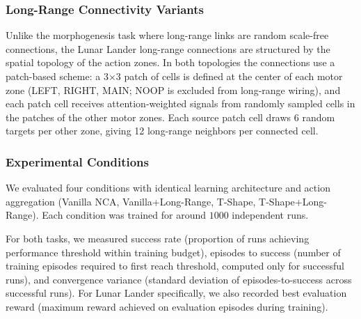 \documentclass[letterpaper]{article}
\begin{document}
\subsubsection{Long-Range Connectivity Variants}

Unlike the morphogenesis task where long-range links are random scale-free connections, the Lunar Lander long-range connections are structured by the spatial topology of the action zones. In both topologies the connections use a patch-based scheme: a 3$\times$3 patch of cells is defined at the center of each motor zone (LEFT, RIGHT, MAIN; NOOP is excluded from long-range wiring), and each patch cell receives attention-weighted signals from randomly sampled cells in the patches of the other motor zones. Each source patch cell draws 6 random targets per other zone, giving 12 long-range neighbors per connected cell.


\subsubsection{Experimental Conditions}

We evaluated four conditions with identical learning architecture and action aggregation (Vanilla NCA, Vanilla+Long-Range, T-Shape, T-Shape+Long-Range). Each condition was trained for around $1000$ independent runs.


For both tasks, we measured success rate (proportion of runs achieving performance threshold within training budget), episodes to success (number of training episodes required to first reach threshold, computed only for successful runs), and convergence variance (standard deviation of episodes-to-success across successful runs). For Lunar Lander specifically, we also recorded best evaluation reward (maximum reward achieved on evaluation episodes during training).

\end{document}
